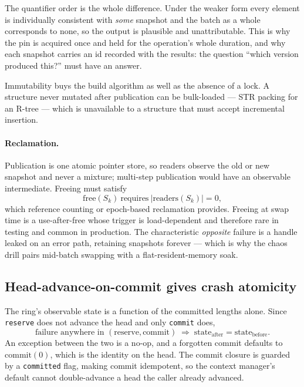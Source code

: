 \documentclass[11pt]{article}
\begin{document}
The quantifier order is the whole difference. Under the weaker form every
element is individually consistent with \emph{some} snapshot and the batch as a
whole corresponds to none, so the output is plausible and unattributable. This
is why the pin is acquired once and held for the operation's whole duration,
and why each snapshot carries an id recorded with the results: the question
``which version produced this?'' must have an answer.

Immutability buys the build algorithm as well as the absence of a lock. A
structure never mutated after publication can be bulk-loaded --- STR packing
for an R-tree --- which is unavailable to a structure that must accept
incremental insertion.

\paragraph{Reclamation.} Publication is one atomic pointer store, so readers
observe the old or new snapshot and never a mixture; multi-step publication
would have an observable intermediate. Freeing must satisfy
\begin{equation}
\mathrm{free}(S_k) \ \text{requires}\ |\mathrm{readers}(S_k)| = 0,
\end{equation}
which reference counting or epoch-based reclamation provides. Freeing at swap
time is a use-after-free whose trigger is load-dependent and therefore rare in
testing and common in production. The characteristic \emph{opposite} failure is
a handle leaked on an error path, retaining snapshots forever --- which is why
the chaos drill pairs mid-batch swapping with a flat-resident-memory soak.

\subsection{Head-advance-on-commit gives crash atomicity}
\label{lbl:HS-MUT-04}

The ring's observable state is a function of the committed lengths alone. Since
\texttt{reserve} does not advance the head and only \texttt{commit} does,
\begin{equation}
\text{failure anywhere in } (\mathrm{reserve}, \mathrm{commit}) \;\Longrightarrow\;
\mathrm{state}_{\mathrm{after}} = \mathrm{state}_{\mathrm{before}} .
\end{equation}
An exception between the two is a no-op, and a forgotten commit defaults to
$\mathrm{commit}(0)$, which is the identity on the head. The commit closure is
guarded by a \texttt{committed} flag, making commit idempotent, so the
context manager's default cannot double-advance a head the caller already
advanced.
\end{document}

